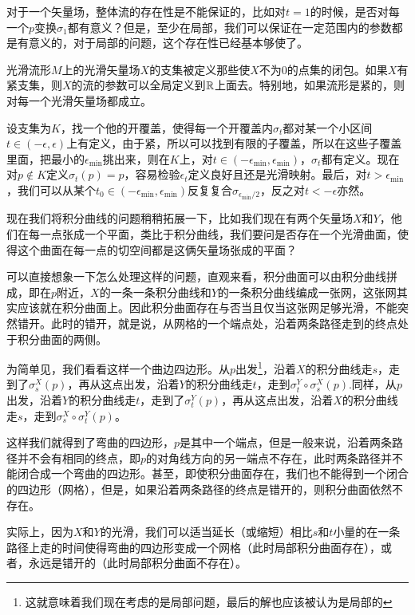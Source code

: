 对于一个矢量场，整体流的存在性是不能保证的，比如对$t=1$的时候，是否对每一个$p$变换$\sigma_1$都有意义？但是，至少在局部，我们可以保证在一定范围内的参数都是有意义的，对于局部的问题，这个存在性已经基本够使了。

\para 光滑流形$M$上的光滑矢量场$X$的支集被定义那些使$X$不为$0$的点集的闭包。如果$X$有紧支集，则$X$的流的参数可以全局定义到$\mathbb{R}$上面去。特别地，如果流形是紧的，则对每一个光滑矢量场都成立。

设支集为$K$，找一个他的开覆盖，使得每一个开覆盖内$\sigma_t$都对某一个小区间$t\in (-\epsilon,\epsilon)$上有定义，由于紧，所以可以找到有限的子覆盖，所以在这些子覆盖里面，把最小的$\epsilon_{\text{min}}$挑出来，则在$K$上，对$t\in(-\epsilon_{\text{min}},\epsilon_{\text{min}})$，$\sigma_t$都有定义。现在对$p\notin K$定义$\sigma_t(p)=p$，容易检验$\epsilon_t$定义良好且还是光滑映射。最后，对$t>\epsilon_{\text{min}}$，我们可以从某个$t_0\in (-\epsilon_{\text{min}},\epsilon_{\text{min}})$反复复合$\sigma_{\epsilon_{\text{min}}/2}$，反之对$t<-\epsilon$亦然。

\para 现在我们将积分曲线的问题稍稍拓展一下，比如我们现在有两个矢量场$X$和$Y$，他们在每一点张成一个平面，类比于积分曲线，我们要问是否存在一个光滑曲面，使得这个曲面在每一点的切空间都是这俩矢量场张成的平面？

可以直接想象一下怎么处理这样的问题，直观来看，积分曲面可以由积分曲线拼成，即在$p$附近，$X$的一条一条积分曲线和$Y$的一条积分曲线编成一张网，这张网其实应该就在积分曲面上。因此积分曲面存在与否当且仅当这张网足够光滑，不能突然错开。此时的错开，就是说，从网格的一个端点处，沿着两条路径走到的终点处于积分曲面的两侧。

为简单见，我们看看这样一个曲边四边形。从$p$出发\footnote{这就意味着我们现在考虑的是局部问题，最后的解也应该被认为是局部的}，沿着$X$的积分曲线走$s$，走到了$\sigma^X_s(p)$，再从这点出发，沿着$Y$的积分曲线走$t$，走到$\sigma^Y_t\circ\sigma^X_s(p)$.同样，从$p$出发，沿着$Y$的积分曲线走$t$，走到了$\sigma^Y_t(p)$，再从这点出发，沿着$X$的积分曲线走$s$，走到$\sigma^X_s\circ\sigma^Y_t(p)$。

这样我们就得到了弯曲的四边形，$p$是其中一个端点，但是一般来说，沿着两条路径并不会有相同的终点，即$p$的对角线方向的另一端点不存在，此时两条路径并不能闭合成一个弯曲的四边形。甚至，即使积分曲面存在，我们也不能得到一个闭合的四边形（网格），但是，如果沿着两条路径的终点是错开的，则积分曲面依然不存在。

实际上，因为$X$和$Y$的光滑，我们可以适当延长（或缩短）相比$s$和$t$小量的在一条路径上走的时间使得弯曲的四边形变成一个网格（此时局部积分曲面存在），或者，永远是错开的（此时局部积分曲面不存在）。

